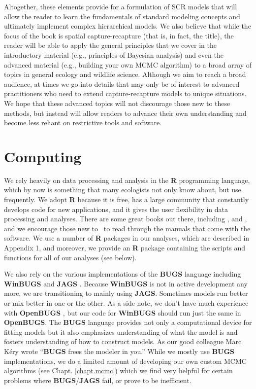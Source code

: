 Altogether, these 
elements
provide for a formulation of SCR models that will allow the reader to
learn the fundamentals of standard modeling concepts and ultimately
implement complex hierarchical models.
We also believe that
while the focus of the book is spatial capture-recapture (that is,
in fact, the title), the reader will be able to apply the general
principles that we cover in the introductory material (e.g., principles
of Bayesian analysis) and even the advanced material (e.g., building
your own MCMC algorithm) to a broad array of topics in general ecology
and wildlife science.
Although we aim to reach a broad audience, at times we go into details
that may only be of interest to advanced practitioners who need to
extend capture-recapture models to unique situations.  We hope that
these advanced topics will not discourage those new to these methods,
but instead
will
allow readers to advance their own
understanding and become less reliant on restrictive tools and
software.


\section*{Computing}

We rely heavily on data processing and analysis in the {\bf R}
programming language, which by now is something that many ecologists
not only know about, but use frequently.  We adopt {\bf R} because it
is free, has a large community that constantly develops code for new
applications, and it gives the user flexibility in data processing and
analyses.  There are some great books out there, including 
\citet{venables_ripley:2002}, \citet{bolker:2008} and \citet{zuur_etal:2009}, and we encourage those
new to \R~to read through the manuals that come with the software.
We use a number of {\bf
  R} packages in our analyses, which are described in Appendix 1, and
moreover, we provide an {\bf R} package containing the scripts and
functions for all of our analyses (see below).

We also rely on the various implementations of the {\bf BUGS}
language including {\bf WinBUGS} \citep{lunn_etal:2000} and {\bf JAGS}
\citep{plummer:2003}.  Because {\bf WinBUGS} is not in active development
any more, we are transitioning to mainly using {\bf JAGS}.  Sometimes
models run better or mix better in one or the other. As a side note,
we don't have much experience with {\bf OpenBUGS}
\citep{thomas_etal:2006}, but our code for {\bf WinBUGS} should run
just the same in {\bf OpenBUGS}. The {\bf BUGS} language provides not
only a computational device for fitting models but it also emphasizes
understanding of what the model is and fosters understanding of how to
construct models.
As our good colleague Marc K\'{e}ry wrote
\citep[][p. 30]{kery:2010}
``{\bf BUGS} frees the modeler in you.''
While we mostly use {\bf BUGS} implementations,
we do a limited amount of developing our own custom MCMC algorithms
(see Chapt. \ref{chapt.mcmc}) which we find very helpful for certain
problems where {\bf BUGS}/{\bf JAGS} fail, or prove to be inefficient.

